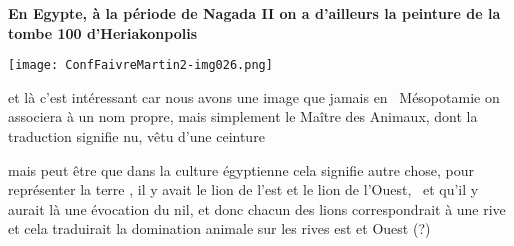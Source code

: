 \documentclass[a4paper]{article}
\begin{document}
\bigskip

{
\textbf{En Egypte, à la période de Nagada II on a d'ailleurs la peinture de la tombe 100 d'Heriakonpolis}}


\bigskip


\bigskip

 \texttt{[image: ConfFaivreMartin2-img026.png]} 


\bigskip


\bigskip

{
et là c'est intéressant car nous avons une image que jamais en \ Mésopotamie on associera à un nom propre, mais
simplement le Maître des Animaux, dont la traduction signifie nu, vêtu d'une ceinture }


\bigskip

{
mais peut être que dans la culture égyptienne cela signifie autre chose, pour représenter la terre , il y avait le lion
de l'est et le lion de l'Ouest, \ et qu'il y aurait là une évocation du nil, et donc chacun des lions correspondrait à
une rive et cela traduirait la domination animale sur les rives est et Ouest (?)}
\end{document}
